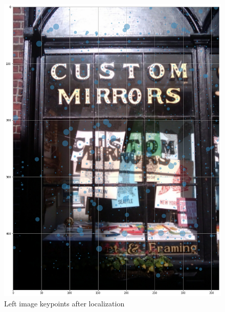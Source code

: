 \documentclass[]{article}
\begin{document}
\begin{figure}[htb]
	\centering
	\includegraphics[width=\linewidth]{CustomMirrorsLeftStep2}
	\caption{Left image keypoints after localization}
	\label{custommirrorsleftstep2}
\end{figure}
\end{document}
